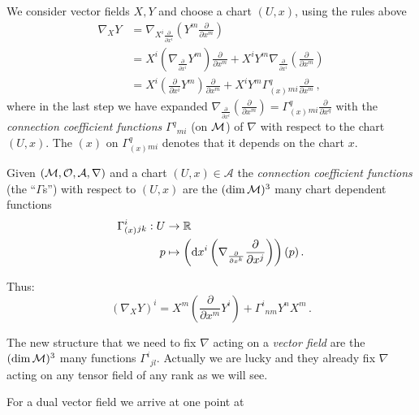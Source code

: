 \documentclass[11pt, a4paper, twocolumn]{article} %
\begin{document}
    We consider vector fields $X, Y$ and choose a chart $(U, x)$, using the rules above
    \begin{align}
        \nabla_X Y &= \nabla_{X^i\frac{\partial}{\partial x^i}} \left( Y^m \frac{\partial}{\partial x^m} \right) \\
        \nonumber &= X^i\left( \nabla_{\frac{\partial}{\partial x^i}} Y^m \right)\frac{\partial}{\partial x^m} +
        X^i Y^m \nabla_{\frac{\partial}{\partial x^i}}\left( \frac{\partial}{\partial x^m} \right) \\
        \nonumber &= X^i\left( \frac{\partial}{\partial x^i} Y^m \right)\frac{\partial}{\partial x^m} +
        X^i Y^m \Gamma^q_{(x)}{}_{mi} \frac{\partial}{\partial x^m}\,,
    \end{align}
    where in the last step we have expanded $\nabla_{\frac{\partial}{\partial x^i}}\left( \frac{\partial}{\partial x^m} \right)
    = \Gamma^q_{(x)}{}_{mi} \frac{\partial}{\partial x^q}$ with the \textit{connection coefficient functions} $\Gamma^q{}_{mi}$
    (on $\mathcal{M}$) of $\nabla$ with respect to the chart $(U,x)$.
    The $(x)$ on $\Gamma^q_{(x)}{}_{mi}$ denotes that it depends on the chart $x$.
    \begin{defn}
        Given $(\mathcal{M}, \mathcal{O}, \mathcal{A}, \nabla)$ and a chart $(U,x)\in\mathcal{A}$ the
        \textit{connection coefficient functions} (the ``$\Gamma$s'') with respect to $(U,x)$
        are the $(\dim \mathcal{M})^3$ many chart dependent functions
        \begin{align}
            \Gamma^i_{(x)}{}_{jk}: U &\to \mathbb{R} \\
            p &\mapsto \left( \operatorname{d\!} x^i \left( \nabla_{\frac{\partial}{\partial x^k}}\frac{\partial}{\partial x^j} \right) \right)(p)\,.
        \end{align}
    \end{defn}
    Thus:
    \begin{equation}
        \left( \nabla_X Y \right)^i = X^m\left( \frac{\partial}{\partial x^m}Y^i \right) +
        \Gamma^i{}_{nm}Y^n X^m\,.
    \end{equation}
    \begin{note}
        The new structure that we need to fix $\nabla$ acting on a \textit{vector field} are the $(\dim \mathcal{M})^3$ many functions 
        $\Gamma^{i}{}_{jl}$. Actually we are lucky and they already fix $\nabla$ acting on any tensor field of any rank as we
        will see.
    \end{note}
    For a dual vector field we arrive at one point at
\end{document}
